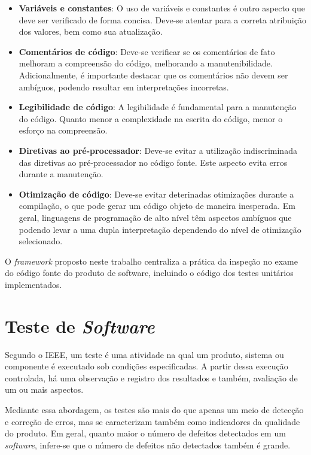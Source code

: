 \begin{itemize}
	\item \textbf{Variáveis e constantes}: O uso de variáveis e constantes é outro aspecto que deve ser verificado de forma concisa. Deve-se atentar para a correta atribuição dos valores, bem como sua atualização.

	\item \textbf{Comentários de código}: Deve-se verificar se os comentários de fato melhoram a compreensão do código, melhorando a manutenibilidade. Adicionalmente, é importante destacar que os comentários não devem ser ambíguos, podendo resultar em interpretações incorretas.

	\item \textbf{Legibilidade de código}: A legibilidade é fundamental para a manutenção do código. Quanto menor a complexidade na escrita do código, menor o esforço na compreensão.

	\item \textbf{Diretivas ao pré-processador}: Deve-se evitar a utilização indiscriminada das diretivas ao pré-processador no código fonte. Este aspecto evita erros durante a manutenção.

	\item \textbf{Otimização de código}: Deve-se evitar deterinadas otimizações durante a compilação, o que pode gerar um código objeto de maneira inesperada. Em geral, linguagens de programação de alto nível têm aspectos ambíguos que podendo levar a uma dupla interpretação dependendo do nível de otimização selecionado.
\end{itemize}

O \textit{framework} proposto neste trabalho centraliza a prática da inspeção no exame do código fonte do produto de software, incluindo o código dos testes unitários implementados.

\section{Teste de \textit{Software}}

Segundo o IEEE, um teste é uma atividade na qual um produto, sistema ou componente é executado sob condições especificadas. A partir dessa execução controlada, há uma observação e registro dos resultados e também, avaliação de um ou mais aspectos.

Mediante essa abordagem, os testes são mais do que apenas um meio de detecção e correção de erros, mas se caracterizam também como indicadores da qualidade do produto. Em geral, quanto maior o número de defeitos detectados em um \textit{software}, infere-se que o número de defeitos não detectados também é grande.

